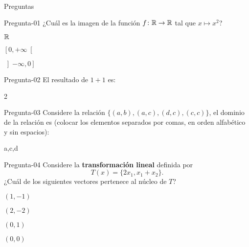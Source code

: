 \documentclass[a4,11pt]{aleph-notas}
\begin{document}
\begin{quiz}{Preguntas}

\begin{multi}[%
    feedback={La respuesta correcta es $\left[0,+\infty\right[$}
    ]%
    {Pregunta-01}
    ¿Cuál es la imagen de la función $f\colon \mathbb{R} \rightarrow \mathbb{R}$ tal que $x\mapsto x^2$?
    \item $\mathbb{R}$
    \item* $\left[0,+\infty\right[$
    \item $\left]-\infty,0\right]$
\end{multi}

\begin{numerical}[tolerance=0.1,%
    feedback={La suma es igual a $2$.}
    ]%
    {Pregunta-02}
    El resultado de $1+1$ es:
    \item 2
\end{numerical}

\begin{shortanswer}[%
    feedback={El dominio de la relación es $\{a,c,d\}$}
    ]%
    {Pregunta-03}
    Considere la relación $\{(a,b), (a,c), (d,c), (c,c)\}$, el dominio de la relación es (colocar los elementos separados por comas, en orden alfabético y sin espacios):
    \item a,c,d
\end{shortanswer}


\begin{multi}[%
    feedback={Para cumplir la restricción del problema, necesitamos que $d((a,1),(1,-1)) = d((a,1),(-1,1))$, es decir, necesitamos que $\mathbb{R}$
    \[
        \sqrt{(a-1)^2+(1-(-1))^2}=\sqrt{(a-(-1))^2+(1-1)^2},
    \]
    cuya solución es $a=1$.}]%
    {Pregunta-04}
    Considere la \textbf{transformación lineal} definida por
    \[
        T(x) = \{2x_1,x_1+x_2\}.
    \]
    ¿Cuál de los siguientes vectores pertenece al núcleo de $T$?
    \item $(1,-1)$
    \item $(2,-2)$
    \item $(0,1)$
    \item* $(0,0)$
\end{multi}



\end{quiz}
\end{document}

